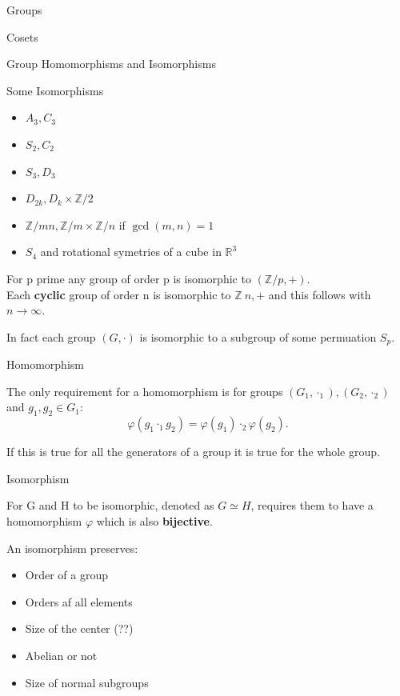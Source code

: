 \documentclass[12pt, letterpaper]{article}
\begin{document}
\begin{section}{Groups}
\begin{subsection}{Cosets}
  \end{subsection}

  \begin{subsection}{Group Homomorphisms and Isomorphisms}

    \begin{subsubsection}{Some Isomorphisms}

      \begin{itemize}
        \item \(A_{3}, C_{3}\)
        \item \(S_{2}, C_{2}\)
        \item \(S_{3}, D_{3}\)
        \item \(D_{2k}, D_{k} \times \mathbb{Z} / 2\)
        \item \(\mathbb{Z} / mn, \mathbb{Z} / m \times \mathbb{Z} / n\) if \(\gcd(m, n) = 1\)
        \item \(S_{4}\) and rotational symetries of a cube in \(\mathbb{R}^{3}\)
      \end{itemize}

      For p prime any group of order p is isomorphic to \((\mathbb{Z} / p, +)\). \\
      Each \textbf{cyclic} group of order n is isomorphic to \(\mathbb{Z} \ n, +\)
      and this follows with \(n \to \infty\).

      In fact each group \((G, \cdot)\) is isomorphic to a subgroup of some
      permuation \(S_{p}\).

    \end{subsubsection}

    \begin{subsubsection}{Homomorphism}

      The only requirement for a homomorphism is for groups \((G_{1}, \cdot_{1}),
      (G_{2}, \cdot_{2})\) and \(g_{1}, g_{2} \in G_{1}\):
      \[\varphi(g_{1} \cdot_{1} g_{2}) = \varphi(g_{1}) \cdot_{2} \varphi(g_{2}).\]

      If this is true for all the generators of a group it is true for the whole
      group.

    \end{subsubsection}

    \begin{subsubsection}{Isomorphism}

      For G and H to be isomorphic, denoted as \(G \simeq H\), requires them
      to have a  homomorphism \(\varphi\) which is also \textbf{bijective}.

      An isomorphism preserves:
      \begin{itemize}
        \item Order of a group
        \item Orders af all elements
        \item Size of the center (??)
        \item Abelian or not
        \item Size of normal subgroups
      \end{itemize}


\end{subsubsection}
\end{subsection}
\end{section}
\end{document}
